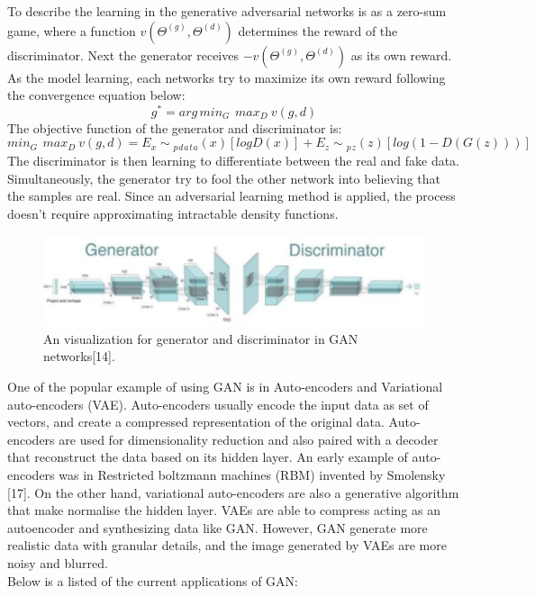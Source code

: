 To describe the learning in the generative adversarial networks is as a zero-sum game, where a function $v(\Theta ^{(g)},\Theta ^{(d)})$ determines the reward of the discriminator. Next the generator receives $-v(\Theta ^{(g)},\Theta ^{(d)})$ as its own reward. As the model learning, each networks try to maximize its own reward following the convergence equation below:
\[g^{*} = arg\,min{_G}\,\: max{_D}\: v(g,d)\]
The objective function of the generator and discriminator is:
\[min{_G}\,\: max{_D}\: v(g,d) = E{_x\sim {_p{_d}{_a}{_t}{_a}(x)}}[logD(x)] + E{_z\sim {_p}{_z}(z)}[{log(1 - D(G(z)))}]\]
\hspace{5mm} The discriminator is then learning to differentiate between the real and fake data. Simultaneously, the generator try to fool the other network into believing that the samples are real. Since an adversarial learning method is applied, the process doesn't require approximating intractable density functions.\\
\begin{figure}[ht]
\centering
\includegraphics{Figures/gan}
\decoRule
\caption[An visualization for generator and discriminator in GAN networks "14".]{An visualization for generator and discriminator in GAN networks[14].}
\label{fig:la}
\end{figure}
One of the popular example of using GAN is in Auto-encoders and Variational auto-encoders (VAE). Auto-encoders usually encode the input data as set of vectors, and create a compressed representation of the original data. Auto-encoders are used for dimensionality reduction and also paired with a decoder that reconstruct the data based on its hidden layer. An early example of auto-encoders was in Restricted boltzmann machines (RBM) invented by Smolensky [17]. On the other hand, variational auto-encoders are also a generative algorithm that make normalise the hidden layer. VAEs are able to compress acting as an autoencoder and synthesizing data like GAN. However, GAN generate more realistic data with granular details, and the image generated by VAEs are more noisy and blurred.\\
\hspace{5mm} Below is a listed of the current applications of GAN:

